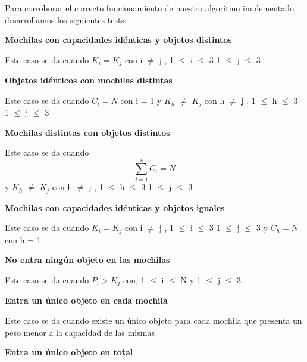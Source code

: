 \indent Para corroborar el correcto funcionamiento de nuestro algoritmo implementado desarrollamos los siguientes tests:\\


\begin{center}
 \textbf{Mochilas con capacidades id\'enticas y objetos distintos}
\end{center}

Este caso se da cuando $K_{i} = K_{j}$ con i $\neq$ j , 1 $\leq$ i $\leq$ 3  1 $\leq$ j $\leq$ 3  \\

\begin{center}
 \textbf{Objetos id\'enticos con mochilas distintas}
\end{center}

Este caso se da cuando $C_{i} = N$ con i = 1 y $K_{h}$ $\neq$ $K_{j}$ con h $\neq$ j , 1 $\leq$ h $\leq$ 3  1 $\leq$ j $\leq$ 3 \\

\begin{center}
 \textbf{Mochilas distintas con objetos distintos}
\end{center}

Este caso se da cuando \[
\sum_{i=1}^{x}C_{i}=N 
\]  y $K_{h}$ $\neq$ $K_{j}$ con h $\neq$ j , 1 $\leq$ h $\leq$ 3  1 $\leq$ j $\leq$ 3 \\


\begin{center}
 \textbf{Mochilas con capacidades id\'enticas y objetos iguales}
\end{center}

Este caso se da cuando $K_{i} = K_{j}$ con i $\neq$ j , 1 $\leq$ i $\leq$ 3  1 $\leq$ j $\leq$ 3  y $C_{h} = N$ con h = 1\\

\begin{center}
 \textbf{No entra ning\'un objeto en las mochilas}
\end{center}

Este caso se da cuando $P_{i} > K_{j}$ con, 1 $\leq$ i $\leq$ N y 1 $\leq$ j $\leq$ 3\\

\begin{center}
 \textbf{Entra un \'unico objeto en cada mochila}
\end{center}

Este caso se da cuando existe un \'unico objeto para cada mochila que presenta un peso menor a la capacidad de las mismas

\begin{center}
 \textbf{Entra un \'unico objeto en total}
\end{center}

